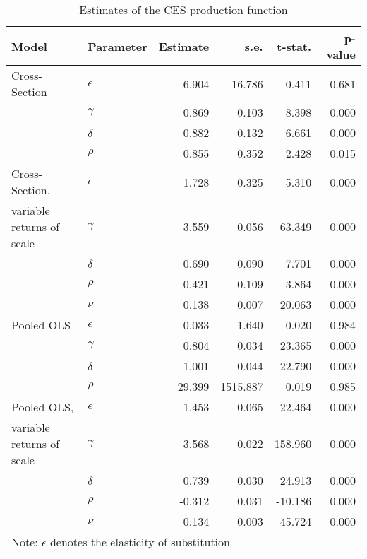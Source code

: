 \documentclass[12pt,a4paper]{article}\usepackage[]{graphicx}\usepackage[]{color}
\begin{document}
\begin{table}[ht]
\centering
\begin{tabular}{llrrrr}
  \toprule
Model & Parameter & Estimate & s.e. & t-stat. & p-value \\ 
  \midrule
Cross-Section & $\epsilon$ & 6.904 & 16.786 & 0.411 & 0.681 \\ 
   & $\gamma$ & 0.869 & 0.103 & 8.398 & 0.000 \\ 
   & $\delta$ & 0.882 & 0.132 & 6.661 & 0.000 \\ 
   & $\rho$ & -0.855 & 0.352 & -2.428 & 0.015 \\ 
   \midrule
Cross-Section, & $\epsilon$ & 1.728 & 0.325 & 5.310 & 0.000 \\ 
  variable returns of scale & $\gamma$ & 3.559 & 0.056 & 63.349 & 0.000 \\ 
   & $\delta$ & 0.690 & 0.090 & 7.701 & 0.000 \\ 
   & $\rho$ & -0.421 & 0.109 & -3.864 & 0.000 \\ 
   & $\nu$ & 0.138 & 0.007 & 20.063 & 0.000 \\ 
   \midrule
Pooled OLS & $\epsilon$ & 0.033 & 1.640 & 0.020 & 0.984 \\ 
   & $\gamma$ & 0.804 & 0.034 & 23.365 & 0.000 \\ 
   & $\delta$ & 1.001 & 0.044 & 22.790 & 0.000 \\ 
   & $\rho$ & 29.399 & 1515.887 & 0.019 & 0.985 \\ 
   \midrule
Pooled OLS, & $\epsilon$ & 1.453 & 0.065 & 22.464 & 0.000 \\ 
  variable returns of scale & $\gamma$ & 3.568 & 0.022 & 158.960 & 0.000 \\ 
   & $\delta$ & 0.739 & 0.030 & 24.913 & 0.000 \\ 
   & $\rho$ & -0.312 & 0.031 & -10.186 & 0.000 \\ 
   & $\nu$ & 0.134 & 0.003 & 45.724 & 0.000 \\ 
   \midrule 
 \multicolumn{5}{l}{\footnotesize{Note: $\epsilon$ denotes the elasticity of substitution}} \\ 
 \bottomrule
\end{tabular}
\caption{Estimates of the CES production function} 
\label{tab:ces}
\end{table}

\end{document}
